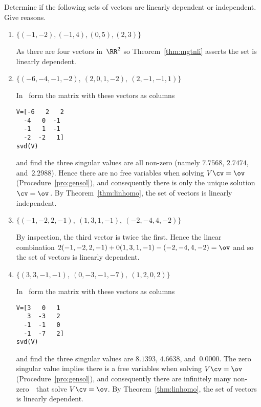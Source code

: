 \begin{example} \label{eg:}
Determine if the following sets of vectors are linearly dependent or independent.  Give reasons.

\begin{enumerate}
\item \(\{(-1,-2), (-1,4), (0,5), (2,3)\}\)
\begin{solution} 
As there are four vectors in~\(\RR^2\) so Theorem~\ref{thm:mgtnli} asserts the set is linearly dependent.
\end{solution}

\item \(\{(-6,-4,-1,-2),\ (2,0,1,-2),\ (2,-1,-1,1)\}\)
\begin{solution} 
In \script\ form the matrix with these vectors as columns
\begin{verbatim}
V=[-6   2   2
  -4   0  -1
  -1   1  -1
  -2  -2   1]
svd(V)
\end{verbatim}
\setbox\ajrqrbox\hbox{}%
\marginpar{\usebox{\ajrqrbox}}%
and find the three singular values are all non-zero (namely \(7.7568\), \(2.7474\), and~\(2.2988\)).
Hence there are no free variables when solving \(V\cv=\ov\) (Procedure~\ref{pro:gensol}), and consequently there is only the unique solution \(\cv=\ov\)\,.
By Theorem~\ref{thm:linhomo}, the set of vectors is linearly independent.
\end{solution}

\item \(\{(-1,-2,2,-1),\ (1,3,1,-1),\ (-2,-4,4,-2)\}\)
\begin{solution} 
By inspection, the third vector is twice the first.
Hence the linear combination \(2(-1,-2,2,-1)+0(1,3,1,-1)-(-2,-4,4,-2)=\ov\) and so the set of vectors is linearly dependent. 
\end{solution}

\item \(\{(3,3,-1,-1),\ (0,-3,-1,-7),\ (1,2,0,2)\}\)
\begin{solution} 
In \script\ form the matrix with these vectors as columns
\begin{verbatim}
V=[3   0   1
   3  -3   2
  -1  -1   0
  -1  -7   2]
svd(V)
\end{verbatim}
\setbox\ajrqrbox\hbox{}%
\marginpar{\usebox{\ajrqrbox}}%
and find the three singular values are \(8.1393\), \(4.6638\), and~\(0.0000\).
The zero singular value implies there is a free variables when solving \(V\cv=\ov\) (Procedure~\ref{pro:gensol}), and consequently there are infinitely many non-zero~\cv\ that solve \(V\cv=\ov\).
By Theorem~\ref{thm:linhomo}, the set of vectors is linearly dependent.
\end{solution}


\end{enumerate}
\end{example}
